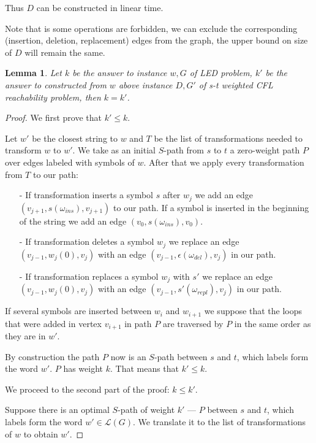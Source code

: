 \documentclass[12pt]{article}
\newtheorem{lemma}{Lemma}[section]
\begin{document}
Thus $D$ can be constructed in linear time.

Note that is some operations are forbidden, we can exclude the corresponding (insertion, deletion, replacement) edges from the graph, the upper bound on size of $D$ will remain the same.

\begin{lemma}
\label{th:led}
Let $k$ be the answer to instance $w, G$ of LED problem, $k'$ be the answer to constructed from $w$ above instance $D, G'$ of s-t weighted CFL reachability problem, then $k = k'$.
\end{lemma}

\begin{proof}
We first prove that $k' \le k$. 

Let $w'$ be the closest string to $w$ and $T$ be the list of transformations needed to transform $w$ to $w'$. We take as an initial $S$-path from $s$ to $t$ a zero-weight path $P$ over edges labeled with symbols of $w$. After that we apply every transformation from $T$ to our path:

\begin{itemize}
    \item[-] If transformation inserts a symbol $s$ after $w_j$ we add an edge $(v_{j+1}, s(\omega_{ins}), v_{j+1})$ to our path. If a symbol is inserted in the beginning of the string we add an edge $(v_{0}, s(\omega_{ins}), v_{0})$.
    \item[-] If transformation deletes a symbol $w_j$ we replace an edge $(v_{j - 1}, w_{j}(0), v_{j})$ with an edge $(v_{j-1}, \epsilon(\omega_{del}), v_{j})$ in our path.
    \item[-] If transformation replaces a symbol $w_j$ with $s'$ we replace an edge $(v_{j - 1}, w_{j}(0), v_{j})$ with an edge $(v_{j-1}, s'(\omega_{repl}), v_{j})$ in our path.
\end{itemize}

If several symbols are inserted between $w_i$ and $w_{i+1}$ we suppose that the loops that were added in vertex $v_{i+1}$ in path $P$ are traversed by $P$ in the same order as they are in $w'$.

By construction the path $P$ now is an $S$-path between $s$ and $t$, which labels form the word $w'$. $P$ has weight $k$. That means that $k' \le k$.

We proceed to the second part of the proof: $k \le k'$.

Suppose there is an optimal $S$-path of weight $k'$ --- $P$ between $s$ and $t$, which labels form the word $w' \in \mathcal{L}(G)$. We translate it to the list of transformations of $w$ to obtain $w'$.


\end{proof}
\end{document}
